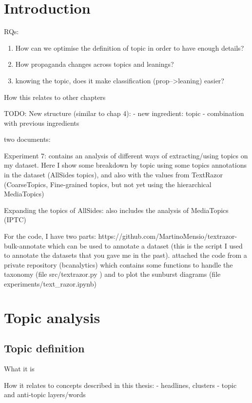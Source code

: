 \label{chap:topics}

\section{Introduction}
RQs:
\begin{enumerate}
    \item How can we optimise the definition of topic in order to have enough details?
    \item How propaganda changes across topics and leanings?
    \item knowing the topic, does it make classification (prop-->leaning) easier?
\end{enumerate}

How this relates to other chapters


TODO: New structure (similar to chap 4):
- new ingredient: topic
- combination with previous ingredients


two documents:

Experiment 7: contains an analysis of different ways of extracting/using topics on my dataset. Here I show some breakdown by topic using some topics annotations in the dataset (AllSides topics), and also with the values from TextRazor (CoarseTopics, Fine-grained topics, but not yet using the hierarchical MediaTopics)

Expanding the topics of AllSides: also includes the analysis of MediaTopics (IPTC)


For the code, I have two parts:
https://github.com/MartinoMensio/textrazor-bulk-annotate which can be used to annotate a dataset (this is the script I used to annotate the datasets that you gave me in the past).
attached the code from a private repository (bcanalytics) which contains some functions to handle the taxonomy (file src/textrazor.py ) and to plot the sunburst diagrams (file experiments/text\_razor.ipynb)

\section{Topic analysis}

\subsection{Topic definition}

What it is

How it relates to concepts described in this thesis:
- headlines, clusters
- topic and anti-topic layers/words

